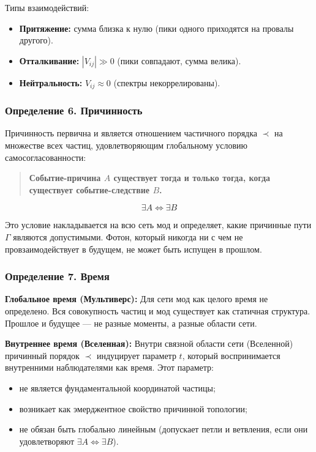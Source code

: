 \documentclass[12pt,a4paper]{article}
\begin{document}
Типы взаимодействий:
\begin{itemize}
    \item \textbf{Притяжение:} сумма близка к нулю (пики одного приходятся на провалы другого).
    \item \textbf{Отталкивание:} $|V_{ij}| \gg 0$ (пики совпадают, сумма велика).
    \item \textbf{Нейтральность:} $V_{ij} \approx 0$ (спектры некоррелированы).
\end{itemize}

\subsubsection{Определение 6. Причинность}
Причинность первична и является отношением частичного порядка $\prec$ на множестве всех частиц, удовлетворяющим глобальному условию самосогласованности:

\begin{quote}
\textbf{Событие-причина $A$ существует тогда и только тогда, когда существует событие-следствие $B$.}
\end{quote}
\begin{equation}
    \exists A \iff \exists B
\end{equation}

Это условие накладывается на всю сеть мод и определяет, какие причинные пути $\Gamma$ являются допустимыми. Фотон, который никогда ни с чем не провзаимодействует в будущем, не может быть испущен в прошлом.

\subsubsection{Определение 7. Время}
\textbf{Глобальное время (Мультиверс):} Для сети мод как целого время не определено. Вся совокупность частиц и мод существует как статичная структура. Прошлое и будущее --- не разные моменты, а разные области сети.

\textbf{Внутреннее время (Вселенная):} Внутри связной области сети (Вселенной) причинный порядок $\prec$ индуцирует параметр $t$, который воспринимается внутренними наблюдателями как время. Этот параметр:
\begin{itemize}
    \item не является фундаментальной координатой частицы;
    \item возникает как эмерджентное свойство причинной топологии;
    \item не обязан быть глобально линейным (допускает петли и ветвления, если они удовлетворяют $\exists A \iff \exists B$).
\end{itemize}
\end{document}
